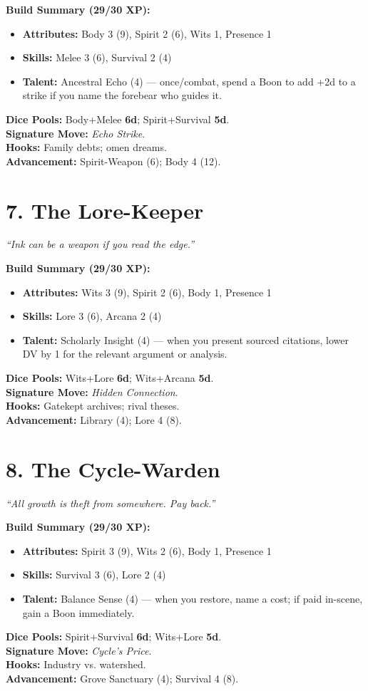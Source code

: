 \begin{multicols}{2}
\textbf{Build Summary (29/30 XP):}
\begin{itemize}
  \item \textbf{Attributes:} Body 3 (9), Spirit 2 (6), Wits 1, Presence 1
  \item \textbf{Skills:} Melee 3 (6), Survival 2 (4)
  \item \textbf{Talent:} Ancestral Echo (4) — once/combat, spend a Boon to add +2d to a strike if you name the forebear who guides it.
\end{itemize}
\textbf{Dice Pools:} Body+Melee \textbf{6d}; Spirit+Survival \textbf{5d}.\\
\textbf{Signature Move:} \emph{Echo Strike}.\\
\textbf{Hooks:} Family debts; omen dreams.\\
\textbf{Advancement:} Spirit-Weapon (6); Body 4 (12).

\section{7. The Lore-Keeper}
\textit{“Ink can be a weapon if you read the edge.”}

\textbf{Build Summary (29/30 XP):}
\begin{itemize}
  \item \textbf{Attributes:} Wits 3 (9), Spirit 2 (6), Body 1, Presence 1
  \item \textbf{Skills:} Lore 3 (6), Arcana 2 (4)
  \item \textbf{Talent:} Scholarly Insight (4) — when you present sourced citations, lower DV by 1 for the relevant argument or analysis.
\end{itemize}
\textbf{Dice Pools:} Wits+Lore \textbf{6d}; Wits+Arcana \textbf{5d}.\\
\textbf{Signature Move:} \emph{Hidden Connection}.\\
\textbf{Hooks:} Gatekept archives; rival theses.\\
\textbf{Advancement:} Library (4); Lore 4 (8).

\section{8. The Cycle-Warden}
\textit{“All growth is theft from somewhere. Pay back.”}

\textbf{Build Summary (29/30 XP):}
\begin{itemize}
  \item \textbf{Attributes:} Spirit 3 (9), Wits 2 (6), Body 1, Presence 1
  \item \textbf{Skills:} Survival 3 (6), Lore 2 (4)
  \item \textbf{Talent:} Balance Sense (4) — when you restore, name a cost; if paid in-scene, gain a Boon immediately.
\end{itemize}
\textbf{Dice Pools:} Spirit+Survival \textbf{6d}; Wits+Lore \textbf{5d}.\\
\textbf{Signature Move:} \emph{Cycle’s Price}.\\
\textbf{Hooks:} Industry vs. watershed.\\
\textbf{Advancement:} Grove Sanctuary (4); Survival 4 (8).


\end{multicols}
